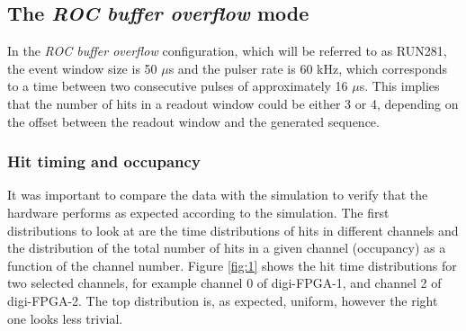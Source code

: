 \subsection{The \textit{ROC buffer overflow} mode}
In the \textit{ROC buffer overflow} configuration, which will be referred to as RUN281, 
the event window size is 50 $\mu$s and the pulser rate is 60 kHz, which corresponds to 
a time between two consecutive pulses of approximately 16 $\mu$s.
This implies that the number of hits in a readout window could be 
either 3 or 4, depending on the offset between the readout window and the generated sequence.
\subsubsection{Hit timing and occupancy}\label{over}
It was important to compare the data with the simulation to verify that the 
hardware performs as expected according to the simulation. 
The first distributions to look at are the time distributions of hits in 
different channels and the distribution of the total number of hits
in a given channel (occupancy) as a function of the channel number.
Figure \ref{fig:1} shows the hit time distributions for two selected 
channels, for example channel 0 of digi-FPGA-1, and channel 2 of digi-FPGA-2.
The top distribution is, as expected, uniform, however the right one looks less trivial.
